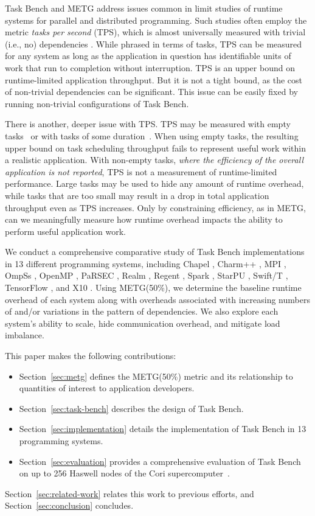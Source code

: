 Task Bench and METG address issues common in limit studies of runtime
systems for parallel and distributed programming. Such studies often
employ the metric \emph{tasks per second} (TPS), which is almost
universally measured with trivial (i.e., no) dependencies \cite{LegionTracing18, Canary16, Armstrong14}. While
phrased in terms of tasks, TPS can be measured for any system as long
as the application in question has identifiable units of work that run
to completion without interruption. TPS is an upper bound on
runtime-limited application throughput. But it is not a tight bound, as the
cost of non-trivial dependencies can be significant. This issue can be easily fixed by running non-trivial
configurations of Task Bench.

There is another, deeper issue with TPS. TPS may be measured with
empty tasks~\cite{LegionTracing18} or with tasks of some
duration~\cite{Canary16, Armstrong14}. When using empty tasks, the
resulting upper bound on task scheduling throughput fails to represent
useful work within a realistic application. With non-empty tasks,
\emph{where the efficiency of the overall application is not
 reported}, TPS is not a measurement of runtime-limited
performance. Large tasks may be used to hide any amount of runtime
overhead, while tasks that are too small may result in a drop in total
application throughput even as TPS increases. Only by constraining
efficiency, as in METG, can we meaningfully measure how runtime
overhead impacts the ability to perform useful application work.

We conduct a comprehensive comparative study of Task Bench
implementations in 13 different programming systems, including
Chapel \cite{Chapel15}, Charm++ \cite{Charmpp93}, MPI \cite{MPI},
OmpSs \cite{OmpSs11}, OpenMP \cite{OpenMPSpec40},
PaRSEC \cite{PARSEC13}, Realm \cite{Realm14}, Regent \cite{Regent15},
Spark \cite{Spark10}, StarPU \cite{StarPU11},
Swift/T \cite{Wozniak13}, TensorFlow \cite{TensorFlow15}, and
X10 \cite{X1005}. Using METG(50\%), we determine the baseline
runtime overhead of each system along with overheads associated with
increasing numbers of and/or variations in the pattern of dependencies. We
also explore each system's ability to scale, hide communication
overhead, and mitigate load imbalance.

This paper makes the following contributions:


\begin{itemize}
\item Section~\ref{sec:metg} defines the METG(50\%) metric and its
  relationship to quantities of interest to application developers.
\item Section~\ref{sec:task-bench} describes the design of Task Bench.
\item Section~\ref{sec:implementation} details the implementation of
  Task Bench in 13 programming systems.
\item Section~\ref{sec:evaluation} provides a comprehensive evaluation
  of Task Bench on up to 256 Haswell nodes of the Cori
  supercomputer~\cite{Cori}.
\end{itemize}

Section~\ref{sec:related-work} relates this work to previous efforts,
and Section~\ref{sec:conclusion} concludes.
